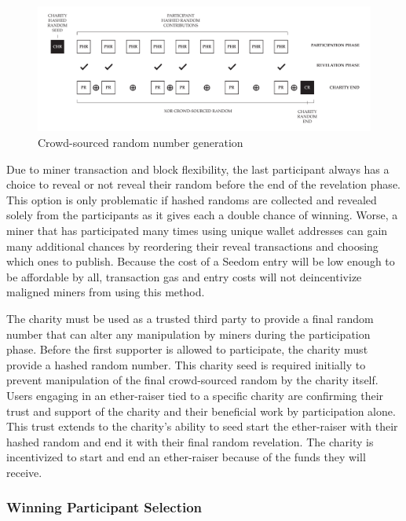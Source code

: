 \documentclass[11pt]{article}
\begin{document}
\begin{figure}[H]
\begin{center}
\includegraphics[width=1.0\textwidth]{crowdsourcedRandomNumberGeneration.pdf}
\caption{Crowd-sourced random number generation}
\label{figure:crowdsourcedRandomNumberGeneration}
\end{center}
\end{figure}

Due to miner transaction and block flexibility, the last participant always has a choice to reveal or not reveal their random before the end of the revelation phase. This option is only problematic if hashed randoms are collected and revealed solely from the participants as it gives each a double chance of winning. Worse, a miner that has participated many times using unique wallet addresses can gain many additional chances by reordering their reveal transactions and choosing which ones to publish. Because the cost of a Seedom entry will be low enough to be affordable by all, transaction gas and entry costs will not deincentivize maligned miners from using this method.

The charity must be used as a trusted third party to provide a final random number that can alter any manipulation by miners during the participation phase. Before the first supporter is allowed to participate, the charity must provide a hashed random number. This charity seed is required initially to prevent manipulation of the final crowd-sourced random by the charity itself. Users engaging in an ether-raiser tied to a specific charity are confirming their trust and support of the charity and their beneficial work by participation alone. This trust extends to the charity's ability to seed start the ether-raiser with their hashed random and end it with their final random revelation. The charity is incentivized to start and end an ether-raiser because of the funds they will receive.

\subsubsection{Winning Participant Selection}
\end{document}
